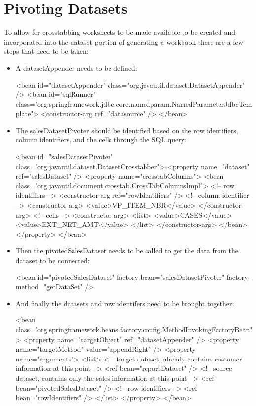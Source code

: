 \documentclass[letterpaper,10pt]{article}
\begin{document}
\section{Pivoting Datasets}
To allow for crosstabbing worksheets to be made available to be created and incorporated into the dataset portion of generating a workbook there are a few steps that need to be taken:
\begin{itemize}
 \item A datasetAppender needs to be defined:
	\begin{verbatimtab}
 	<bean id="datasetAppender" class="org.javautil.dataset.DatasetAppender" />
	<bean id="sqlRunner"
		class="org.springframework.jdbc.core.namedparam.NamedParameterJdbcTemplate">
		<constructor-arg ref="datasource" />
	</bean>
	\end{verbatimtab}
 \item The salesDatasetPivoter should be identified based on the row identifiers, column identifiers, and the cells through the SQL query:
	\begin{verbatimtab}
<bean id="salesDatasetPivoter" class="org.javautil.dataset.DatasetCrosstabber">
	<property name="dataset" ref="salesDataset" />
	<property name="crosstabColumns">
		<bean class="org.javautil.document.crosstab.CrossTabColumnsImpl">
			<!-- row identifiers -->
			<constructor-arg ref="rowIdentifiers" />
			<!-- column identifier -->
			<constructor-arg>
				<value>VP_ITEM_NBR</value>
			</constructor-arg>
			<!-- cells -->
			<constructor-arg>
				<list>
					<value>CASES</value>
					<value>EXT_NET_AMT</value>
				</list>
			</constructor-arg>
		</bean>
	</property>
</bean>
	\end{verbatimtab}
 \item Then the pivotedSalesDataset needs to be called to get the data from the dataset to be connected:
	\begin{verbatimtab}
	 <bean id="pivotedSalesDataset" factory-bean="salesDatasetPivoter"
	factory-method="getDataSet" />
	\end{verbatimtab}
 \item And finally the datasets and row identifers need to be brought together:
	\begin{verbatimtab}
<bean class="org.springframework.beans.factory.config.MethodInvokingFactoryBean">
	<property name="targetObject" ref="datasetAppender" />
	<property name="targetMethod" value="appendRight" />
	<property name="arguments">
		<list>
			<!-- target dataset, already contains customer information at this point -->
			<ref bean="reportDataset" />
			<!-- source dataset, contains only the sales information at this point -->
			<ref bean="pivotedSalesDataset" />
			<!-- row identifiers -->
			<ref bean="rowIdentifiers" />
		</list>
	</property>
</bean>
	\end{verbatimtab}
\end{itemize}
\end{document}
